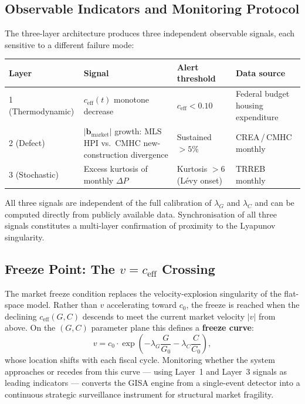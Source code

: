 \documentclass[12pt,a4paper]{article}
\begin{document}
\subsection{Observable Indicators and Monitoring Protocol}

The three-layer architecture produces three independent observable
signals, each sensitive to a different failure mode:

\begin{center}
\begin{tabular}{p{2.4cm}p{4.8cm}p{2.4cm}p{2.8cm}}
\toprule
Layer & Signal & Alert threshold & Data source \\
\midrule
1 (Thermo\-dynamic) &
  $c_{\mathrm{eff}}(t)$ monotone decrease &
  $c_{\mathrm{eff}} < 0.10$ &
  Federal budget housing expenditure \\
2 (Defect) &
  $\lvert\mathbf{b}_{\mathrm{market}}\rvert$ growth:
  MLS\,HPI vs.\ CMHC new-construction divergence &
  Sustained $> 5\%$ &
  CREA\,/\,CMHC monthly \\
3 (Stochastic) &
  Excess kurtosis of monthly $\Delta P$ &
  Kurtosis $> 6$ (L\'evy onset) &
  TRREB monthly \\
\bottomrule
\end{tabular}
\end{center}

All three signals are independent of the full calibration of
$\lambda_G$ and $\lambda_C$ and can be computed directly from
publicly available data. Synchronisation of all three signals
constitutes a multi-layer confirmation of proximity to the
Lyapunov singularity.

\subsection{Freeze Point: The $v = c_{\mathrm{eff}}$ Crossing}

The market freeze condition replaces the velocity-explosion singularity
of the flat-space model. Rather than $v$ accelerating toward $c_0$,
the freeze is reached when the declining $c_{\mathrm{eff}}(G, C)$
descends to meet the current market velocity $|v|$ from above. On the
$(G, C)$ parameter plane this defines a \textbf{freeze curve}:
\begin{equation}
    \boxed{v = c_0 \cdot \exp\!\left(
    -\lambda_G \frac{G}{G_0} - \lambda_C \frac{C}{C_0}\right)},
\end{equation}
whose location shifts with each fiscal cycle. Monitoring whether the
system approaches or recedes from this curve --- using Layer~1 and
Layer~3 signals as leading indicators --- converts the GISA engine
from a single-event detector into a continuous strategic surveillance
instrument for structural market fragility.
\end{document}
